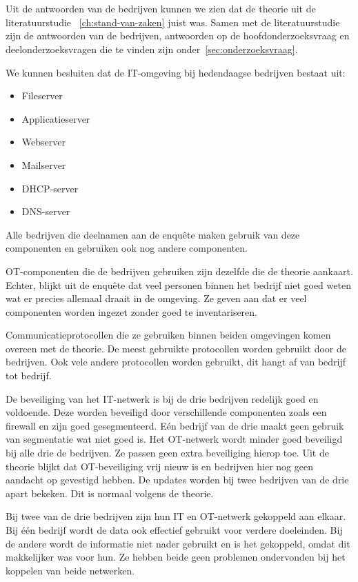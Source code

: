 \section{}
\label{sec:Algemeen}
Uit de antwoorden van de bedrijven kunnen we zien dat de theorie uit de literatuurstudie ~\ref{ch:stand-van-zaken} juist was. Samen met de literatuurstudie zijn de antwoorden van de bedrijven, antwoorden op de hoofdonderzoeksvraag en deelonderzoeksvragen die te vinden zijn onder~\ref{sec:onderzoeksvraag}. 

We kunnen besluiten dat de IT-omgeving bij hedendaagse bedrijven bestaat uit:
\begin{itemize}
    \item Fileserver
    \item Applicatieserver
    \item Webserver
    \item Mailserver
    \item DHCP-server
    \item DNS-server
\end{itemize}
Alle bedrijven die deelnamen aan de enquête maken gebruik van deze componenten en gebruiken ook nog andere componenten. 

OT-componenten die de bedrijven gebruiken zijn dezelfde die de theorie aankaart. Echter, blijkt uit de enquête dat veel personen binnen het bedrijf niet goed weten wat er precies allemaal draait in de omgeving. Ze geven aan dat er veel componenten worden ingezet zonder goed te inventariseren. 

Communicatieprotocollen die ze gebruiken binnen beiden omgevingen komen overeen met de theorie. De meest gebruikte protocollen worden gebruikt door de bedrijven. Ook vele andere protocollen worden gebruikt, dit hangt af van bedrijf tot bedrijf.

De beveiliging van het IT-netwerk is bij de drie bedrijven redelijk goed en voldoende. Deze worden beveiligd door verschillende componenten zoals een firewall en zijn goed gesegmenteerd. Eén bedrijf van de drie maakt geen gebruik van segmentatie wat niet goed is. Het OT-netwerk wordt minder goed beveiligd bij alle drie de bedrijven. Ze passen geen extra beveiliging hierop toe. Uit de theorie blijkt dat OT-beveiliging vrij nieuw is en bedrijven hier nog geen aandacht op gevestigd hebben. De updates worden bij twee bedrijven van de drie apart bekeken. Dit is normaal volgens de theorie.

Bij twee van de drie bedrijven zijn hun IT en OT-netwerk gekoppeld aan elkaar. Bij één bedrijf wordt de data ook effectief gebruikt voor verdere doeleinden. Bij de andere wordt de informatie niet nader gebruikt en is het gekoppeld, omdat dit makkelijker was voor hun. Ze hebben beide geen problemen ondervonden bij het koppelen van beide netwerken. 



